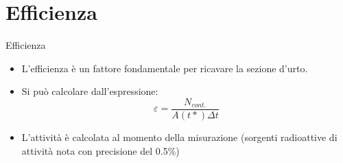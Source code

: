 \documentclass [xcolor=svgnames, 9pt] {beamer}
\begin{document}
\section{Efficienza}
\begin{frame}{Efficienza}
	\begin{itemize}
		\item L'efficienza è un fattore fondamentale per ricavare la sezione d'urto.
		\item Si può calcolare dall'espressione:
		\begin{equation}
			\varepsilon = \dfrac{N_{cont.}}{A(t*) \Delta t}
		\end{equation}
		\item L'attività è calcolata al momento della misurazione (sorgenti radioattive di attività nota con precisione del 0.5\%) %
	\end{itemize}
	
	\vspace{0.5cm}
	

\end{frame}
\end{document}
